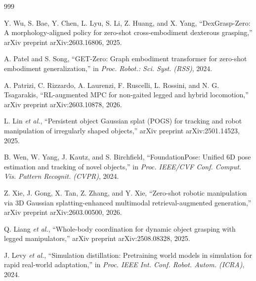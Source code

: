 \documentclass[11pt,a4paper]{article}
\begin{document}
\begin{thebibliography}{999}

Y. Wu, S. Bae, Y. Chen, L. Lyu, S. Li, Z. Huang, and X. Yang, ``{DexGrasp-Zero}: A morphology-aligned policy for zero-shot cross-embodiment dexterous grasping,'' arXiv preprint arXiv:2603.16806, 2025.




A. Patel and S. Song, ``{GET-Zero}: Graph embodiment transformer for zero-shot embodiment generalization,'' in \textit{Proc. Robot.: Sci. Syst. (RSS)}, 2024.




A. Patrizi, C. Rizzardo, A. Laurenzi, F. Ruscelli, L. Rossini, and N. G. Tsagarakis, ``RL-augmented MPC for non-gaited legged and hybrid locomotion,'' arXiv preprint arXiv:2603.10878, 2026.




L. Lin \textit{et al.}, ``Persistent object Gaussian splat ({POGS}) for tracking and robot manipulation of irregularly shaped objects,'' arXiv preprint arXiv:2501.14523, 2025.




B. Wen, W. Yang, J. Kautz, and S. Birchfield, ``FoundationPose: Unified 6D pose estimation and tracking of novel objects,'' in \textit{Proc. IEEE/CVF Conf. Comput. Vis. Pattern Recognit. (CVPR)}, 2024.




Z. Xie, J. Gong, X. Tan, Z. Zhang, and Y. Xie, ``Zero-shot robotic manipulation via {3D} Gaussian splatting-enhanced multimodal retrieval-augmented generation,'' arXiv preprint arXiv:2603.00500, 2026.




Q. Liang \textit{et al.}, ``Whole-body coordination for dynamic object grasping with legged manipulators,'' arXiv preprint arXiv:2508.08328, 2025.




J. Levy \textit{et al.}, ``Simulation distillation: Pretraining world models in simulation for rapid real-world adaptation,'' in \textit{Proc. IEEE Int. Conf. Robot. Autom. (ICRA)}, 2024.




\end{thebibliography}
\end{document}
